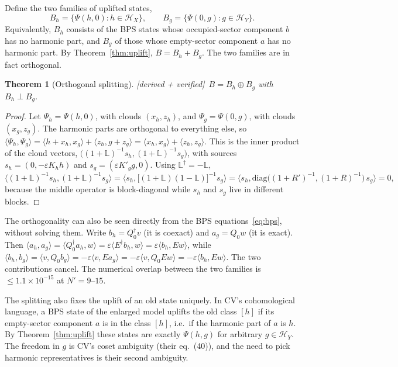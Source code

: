 \documentclass[11pt]{article}
\newcommand{\Np}{N'}
\newcommand{\ip}[2]{\langle #1,#2\rangle}
\newcommand{\eps}{\varepsilon}
\newcommand{\Hc}{\mathcal H}
\newcommand{\LL}{\mathbb L}
\newcommand{\Kh}{K_h}
\newcommand{\Kg}{{K'_g}}
\newcommand{\tagbox}[2]{\textsf{\small\color{#1}[#2]}}
\newcommand{\VER}{\tagbox{cder}{derived + verified}}
\theoremstyle{plain}
\newtheorem{theorem}{Theorem}
\theoremstyle{remark}
\numberwithin{equation}{section}
\begin{document}
Define the two families of uplifted states,
\begin{equation}\label{eq:families}
B_h=\{\Psi(h,0):h\in\Hc_X\},\qquad B_g=\{\Psi(0,g):g\in\Hc_Y\}.
\end{equation}
Equivalently, $B_h$ consists of the BPS states whose occupied-sector component $b$ has no harmonic part, and $B_g$ of
those whose empty-sector component $a$ has no harmonic part. By Theorem~\ref{thm:uplift}, $B=B_h+B_g$. The two families
are in fact orthogonal.

\begin{theorem}[Orthogonal splitting]\label{thm:split}\VER\
$B=B_h\oplus B_g$ with $B_h\perp B_g$.
\end{theorem}

\begin{proof}
Let $\Psi_h=\Psi(h,0)$, with clouds $(x_h,z_h)$, and $\Psi_g=\Psi(0,g)$, with clouds $(x_g,z_g)$. The harmonic parts are
orthogonal to everything else, so
$\ip{\Psi_h}{\Psi_g}=\ip{h+x_h}{x_g}+\ip{z_h}{g+z_g}=\ip{x_h}{x_g}+\ip{z_h}{z_g}$. This is the inner product of the
cloud vectors, $\big((1+\LL)^{-1}s_h,(1+\LL)^{-1}s_g\big)$, with sources $s_h=(0,-\eps\Kh h)$ and $s_g=(\eps\Kg g,0)$.
Using $\LL^\dagger=-\LL$,
\[
\ip{(1+\LL)^{-1}s_h}{(1+\LL)^{-1}s_g}=\ip{s_h}{\big[(1+\LL)(1-\LL)\big]^{-1}s_g}=\ip{s_h}{\mathrm{diag}\big((1+R')^{-1},(1+R)^{-1}\big)\,s_g}=0,
\]
because the middle operator is block-diagonal while $s_h$ and $s_g$ live in different blocks.
\end{proof}

\noindent The orthogonality can also be seen directly from the BPS equations~\eqref{eq:bps}, without solving them. Write
$b_h=Q_0^\dagger v$ (it is coexact) and $a_g=Q_0w$ (it is exact). Then
$\ip{a_h}{a_g}=\ip{Q_0^\dagger a_h}{w}=\eps\ip{E^\dagger b_h}{w}=\eps\ip{b_h}{Ew}$, while
$\ip{b_h}{b_g}=\ip{v}{Q_0b_g}=-\eps\ip{v}{Ea_g}=-\eps\ip{v}{Q_0Ew}=-\eps\ip{b_h}{Ew}$. The two contributions cancel. The
numerical overlap between the two families is $\le1.1\times10^{-15}$ at $\Np=9$--$15$.

The splitting also fixes the uplift of an old state uniquely. In CV's cohomological language, a BPS state of the enlarged
model uplifts the old class $[h]$ if its empty-sector component $a$ is in the class $[h]$, i.e.\ if the harmonic part of
$a$ is $h$. By Theorem~\ref{thm:uplift} these states are exactly $\Psi(h,g)$ for arbitrary $g\in\Hc_Y$. The freedom in
$g$ is CV's coset ambiguity (their eq.~(40)), and the need to pick harmonic representatives is their second ambiguity.
\end{document}

